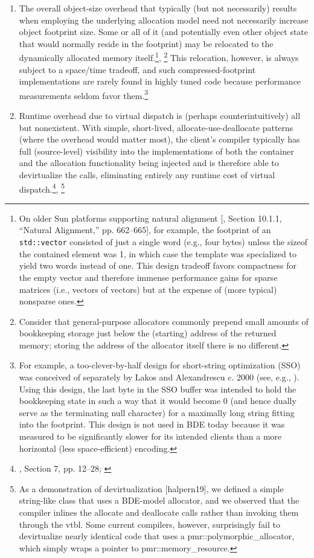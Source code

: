 \begin{enumerate}
\item The overall object-size overhead that typically (but not necessarily) results
when employing the underlying allocation model need not necessarily increase
object footprint size. Some or all of it (and potentially even other object state
that would normally reside in the footprint) may be relocated to the
dynamically allocated memory itself.\footnote{On older Sun platforms supporting natural alignment [\cite{lakos96}, Section 10.1.1, “Natural
Alignment,” pp. 662–665], for example, the footprint of an \lstinline{std::vector} consisted of just a single
word (e.g., four bytes) unless the sizeof the contained element was 1, in which case the template
was specialized to yield two words instead of one. This design tradeoff favors compactness for the
empty vector and therefore immense performance gains for sparse matrices (i.e., vectors of vectors)
but at the expense of (more typical) nonsparse ones.}, \footnote{Consider that general-purpose
allocators commonly prepend small amounts of bookkeeping
storage just below the (starting) address of the returned memory; storing the address of the allocator
itself there is no different.} This relocation, however, is always
subject to a space/time tradeoff, and such compressed-footprint
implementations are rarely found in highly tuned code because performance
measurements seldom favor them.\footnote{For example, a too-clever-by-half design for short-string optimization (SSO) was conceived of
separately by Lakos and Alexandrescu c. 2000 (see, e.g., \cite{alexandrescu04}). Using this design, the last
byte in the SSO buffer was intended to hold the bookkeeping state in such a way that it would
become 0 (and hence dually serve as the terminating null character) for a maximally long string
fitting into the footprint. This design is not used in BDE today because it was measured to be
significantly slower for its intended clients than a more horizontal (less space-efficient) encoding.}


\item Runtime overhead due to virtual dispatch is (perhaps counterintuitively) all
but nonexistent. With simple, short-lived, allocate-use-deallocate patterns
(where the overhead would matter most), the client’s compiler typically has
full (source-level) visibility into the implementations of both the container and
the allocation functionality being injected and is therefore able to devirtualize
the calls, eliminating entirely any runtime cost of virtual
dispatch.\footnote{\cite{lakos16}, Section 7, pp. 12–28; \cite{bleaney16}}, \footnote{As a
demonstration of devirtualization [halpern19], we defined a simple string-like class that uses
a BDE-model allocator, and we observed that the compiler inlines the allocate and deallocate
calls rather than invoking them through the vtbl. Some current compilers, however, surprisingly fail
to devirtualize nearly identical code that uses a pmr::polymorphic_allocator, which simply wraps
a pointer to pmr::memory_resource.}


\end{enumerate}
